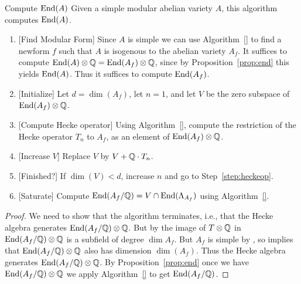 \documentclass{article}
\begin{document}
\begin{algorithm}{Compute $\operatorname{End}(A)$}
	Given a simple modular abelian variety $A$, this algorithm
	computes $\operatorname{End}(A)$.
	\begin{enumerate}
		\item{} [Find Modular Form] Since $A$ is simple we can use
		      Algorithm~\ref{} to find a newform $f$ such that $A$ is isogenous to
		      the abelian variety $A_f$.  It suffices to compute $\operatorname{End}(A)\otimes\mathbb{Q}
			      = \operatorname{End}(A_f)\otimes\mathbb{Q}$, since by Proposition~\ref{prop:end} this
		      yields $\operatorname{End}(A)$.  Thus it suffices to compute $\operatorname{End}(A_f)$.
		\item{} [Initialize] Let $d=\dim(A_f)$, let $n=1$, and let $V$ be the
		      zero subspace of $\operatorname{End}(A_f)\otimes\mathbb{Q}$.
		\item{} [Compute Hecke operator]\label{step:heckeop} Using
		      Algorithm~\ref{}, compute the restriction of the Hecke operator
		      $T_n$ to $A_f$, as an element of $\operatorname{End}(A_f)\otimes\mathbb{Q}$.
		\item{} [Increase $V$] Replace $V$ by $V+\mathbb{Q}\cdot T_n$.
		\item{} [Finished?]  If $\dim(V) < d$, increase $n$ and go to
		      Step~\ref{step:heckeop}.
		\item{} [Saturate] Compute $\operatorname{End}(A_f/\mathbb{Q}) = V \cap \operatorname{End}(\Lambda_{A_f})$
		      using Algorithm~\ref{}.
	\end{enumerate}
\end{algorithm}
\begin{proof}
	We need to show that the algorithm terminates, i.e., that the Hecke
	algebra generates $\operatorname{End}(A_f/\mathbb{Q}) \otimes \mathbb{Q}$. But by
	\cite[Thm.~1]{shimura:factors} the image of $T \otimes \mathbb{Q}$ in
	$\operatorname{End}(A_f/\mathbb{Q}) \otimes \mathbb{Q}$ is a subfield of degree $\dim A_f$. But
	$A_f$ is simple by \cite[Cor.~4.2]{ribet:twistsendoalg}, so
	\cite[Thm.~2.1]{ribet:abvars} implies that $\operatorname{End}(A_f/\mathbb{Q}) \otimes \mathbb{Q}$
	also has dimension $\dim(A_f)$. Thus the Hecke algebra generates
	$\operatorname{End}(A_f/\mathbb{Q}) \otimes \mathbb{Q}$. By Proposition~\ref{prop:end} once we
	have $\operatorname{End}(A_f/\mathbb{Q}) \otimes \mathbb{Q}$ we apply Algorithm~\ref{} to get
	$\operatorname{End}(A_f/\mathbb{Q})$.
\end{proof}
\end{document}
